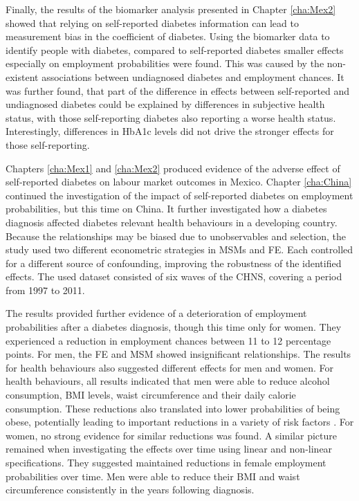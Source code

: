 Finally, the results of the biomarker analysis presented in Chapter \ref{cha:Mex2} showed that relying on self-reported diabetes information can lead to measurement bias in the coefficient of diabetes. Using the biomarker data to identify people with diabetes, compared to self-reported diabetes smaller effects especially on employment probabilities were found. This was caused by the non-existent associations between undiagnosed diabetes and employment chances. It was further found, that part of the difference in effects between self-reported and undiagnosed diabetes could be explained by differences in subjective health status, with those self-reporting diabetes also reporting a worse health status. Interestingly, differences in \ac{HbA1c} levels did not drive the stronger effects for those self-reporting. %

Chapters \ref{cha:Mex1} and \ref{cha:Mex2} produced evidence of the adverse effect of self-reported diabetes on labour market outcomes in Mexico. Chapter \ref{cha:China} continued the investigation of the impact of self-reported diabetes on employment probabilities, but this time on China. It further investigated how a diabetes diagnosis affected diabetes relevant health behaviours in a developing country. Because the relationships may be biased due to unobservables and selection, the study used two different econometric strategies in \acp{MSM} and \ac{FE}. Each controlled for a different source of confounding, improving the robustness of the identified effects. The used dataset consisted of six waves of the \ac{CHNS}, covering a period from 1997 to 2011.

The results provided further evidence of a deterioration of employment probabilities after a diabetes diagnosis, though this time only for women. They experienced a reduction in employment chances between 11 to 12 percentage points. For men, the \ac{FE} and \ac{MSM} showed insignificant relationships. The results for health behaviours also suggested different effects for men and women. For health behaviours, all results indicated that men were able to reduce alcohol consumption, \ac{BMI} levels, waist circumference and their daily calorie consumption. These reductions also translated into lower probabilities of being obese, potentially leading to important reductions in a variety of risk factors \parencite{Wilding2014}. For women, no strong evidence for similar reductions was found. A similar picture remained when investigating the effects over time using linear and non-linear specifications. They suggested maintained reductions in female employment probabilities over time. Men were able to reduce their \ac{BMI} and waist circumference consistently in the years following diagnosis.

